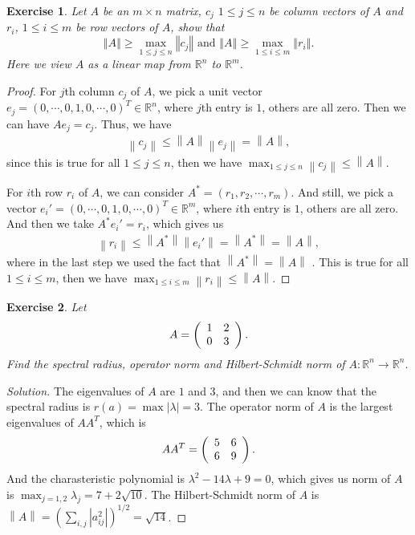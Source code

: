 \documentclass[10pt]{book}
\newtheorem{exercise}{Exercise}[section]
\theoremstyle{definition}
\numberwithin{equation}{chapter}
\begin{document}
\begin{exercise}
Let $A$ be an $m\times n$ matrix, $c_{j}$ $1\leq j\leq n$ be column
vectors of $A$ and $r_{i}$, $1\leq i\leq m$ be row vectors of $A$, show that%
$$
\left\Vert A\right\Vert \geq\max_{1\leq j\leq n}\left\Vert c_{j}\right\Vert
\text{ and }\left\Vert A\right\Vert \geq\max_{1\leq i\leq m}\left\Vert
r_{i}\right\Vert .
$$
Here we view $A$ as a linear map from $\mathbb{R}^{n}$ to $\mathbb{R}^{m}$.
\end{exercise}
\begin{proof}
For $j$th column $c_j$ of $A$, we pick a unit vector $e_j = (0,\cdots, 0,1,0,\cdots,0)^T \in \mathbb{R}^n$, where $j$th entry is $1$, others are all zero. Then we can have $Ae_j = c_j$. Thus, we have 
\begin{align*}
    \left\|c_j \right\| \leq \left\|A \right\| \left\|e_j  \right\| = \left\|A \right\|,
\end{align*}
since this is true for all $1\leq j \leq n$, then we have $\max_{1\leq j \leq n}\left\|c_j \right\| \leq \left\|A \right\|$. 

For $i$th row $r_i$ of $A$, we can consider $A^* = (r_1, r_2,\cdots, r_m)$. And still, we pick a vector $e_i' = (0,\cdots, 0,1,0,\cdots,0)^T \in \mathbb{R}^m$, where $i$th entry is $1$, others are all zero. And then we take $A^* e_i' = r_i$, which gives us 
\begin{align*}
    \left\|r_i \right\| \leq \left\|A^* \right\| \left\|e_i'  \right\| = \left\|A^* \right\| = \left\|A \right\|,
\end{align*}
where in the last step we used the fact that $\left\|A^* \right\| = \left\|A \right\|$ . This is true for all $1\leq i \leq m$, then we have $\max_{1\leq i \leq m}\left\|r_i \right\| \leq \left\|A \right\|$.
\end{proof}

\medskip

\begin{exercise}
Let
$$
A=\left(
\begin{array}
[c]{cc}%
1 & 2\\
0 & 3
\end{array}
\right)  .
$$
Find the spectral radius, operator norm and Hilbert-Schmidt norm of
$A:\mathbb{R}^{n}\rightarrow\mathbb{R}^{n}$.
\end{exercise}
\begin{proof}[Solution]
The eigenvalues of $A$ are $1$ and $3$, and then we can know that the spectral radius is $r(a) = \max \left|\lambda\right| = 3$. The operator norm of $A$ is  the largest eigenvalues of $AA^T$, which is 
$$
AA^T=\left(
\begin{array}
[c]{cc}%
5 & 6\\
6 & 9
\end{array}
\right).
$$
And the charasteristic polynomial is $\lambda^2 - 14\lambda + 9 = 0$, which gives us norm of $A$ is $\max_{j=1,2} \lambda_j = 7+2\sqrt{10}$. The Hilbert-Schmidt norm of $A$ is $\left\| A\right\| = \left(\sum_{i,j}|a_{ij}^2| \right)^{1/2} = \sqrt{14}$.
\end{proof}
\end{document}

